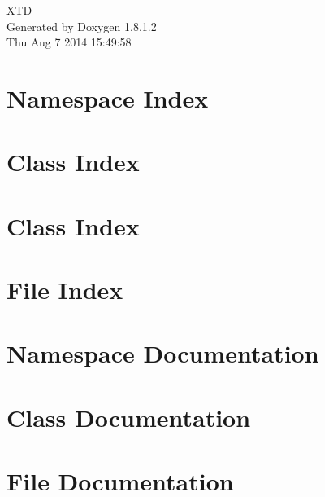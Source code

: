 \documentclass{book}
\begin{document}
\hypersetup{pageanchor=false,citecolor=blue}
\begin{titlepage}
\vspace*{7cm}
\begin{center}
{\Large X\-T\-D }\\
\vspace*{1cm}
{\large Generated by Doxygen 1.8.1.2}\\
\vspace*{0.5cm}
{\small Thu Aug 7 2014 15:49:58}\\
\end{center}
\end{titlepage}
\clearemptydoublepage
{}
\tableofcontents
\clearemptydoublepage
{}
\hypersetup{pageanchor=true,citecolor=blue}
\chapter{Namespace Index}

\chapter{Class Index}

\chapter{Class Index}

\chapter{File Index}

\chapter{Namespace Documentation}


\chapter{Class Documentation}




























\chapter{File Documentation}

\printindex
\end{document}
